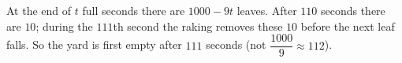 At the end of $t$ full seconds there are $1000-9t$ leaves. After $110$ seconds there are $10$; during the $111$th second the raking removes these $10$ before the next leaf falls. So the yard is first empty after $\boxed{111}$ seconds (not $\dfrac{1000}9\approx112$).

